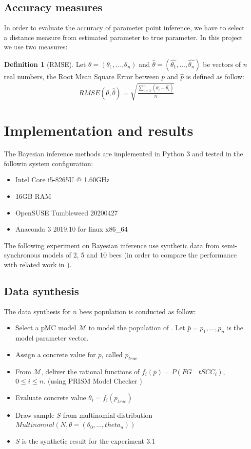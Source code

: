 \documentclass[12pt]{article}
\theoremstyle{definition}
\newtheorem{definition}{Definition}[section]
\begin{document}
\subsection{Accuracy measures}
In order to evaluate the accuracy of parameter point inference, we have to
select a distance measure from estimated parameter to true parameter. In this
project we use two measures:
\begin{definition}[RMSE]
  Let $\theta = (\theta_1,\ldots,\theta_n)$ and $\hat{\theta} =
  (\hat{\theta_1},\ldots,\hat{\theta_n})$ be vectors of $n$ real numbers, the
  Root Mean Square Error between $p$ and $\hat{p}$ is defined as follow:
  \begin{align*}
    RMSE(\theta, \hat{\theta}) = \sqrt{\frac{\sum_{i=1}^n{(\theta_i - \hat{\theta_i})}}{n}}
  \end{align*}
\end{definition}

\section{Implementation and results}
The Bayesian inference methods are implemented in Python 3 and tested in the
followin system configuration:
\begin{itemize}
\item Intel Core i5-8265U @ 1.60GHz
\item 16GB RAM
\item OpenSUSE Tumbleweed 20200427
\item Anaconda 3 2019.10 for linux x86\_64
\end{itemize}
The following experiment on Bayesian inference use synthetic data from
semi-synchronous models of 2, 5 and 10 bees (in order to compare the performance
with related work in \cite{hajnal2019data}).


\subsection{Data synthesis}
The data synthesis for $n$ bees population is conducted as follow:
\begin{itemize}
\item Select a pMC model $\mathcal{M}$ to model the population of . Let
  $\bar{p}=p_1,\ldots,p_n$ is the model parameter vector.
\item Assign a concrete value for $\bar{p}$, called $\bar{p}_{true}$
\item From $\mathcal{M}$, deliver the rational functions of $f_i(\bar{p}) =
  P(FG\quad tSCC_i)$, $0 \leq i \leq n$. (using PRISM Model Checker \cite{KNP11})
\item Evaluate concrete value $\theta_i = f_i(\bar{p}_{true})$
\item Draw sample $S$ from multinomial distribution $Multinomial(N,
  \theta=(\theta_0,\ldots,theta_n))$
\item $S$ is the synthetic result for the experiment 3.1
\end{itemize}
\end{document}
